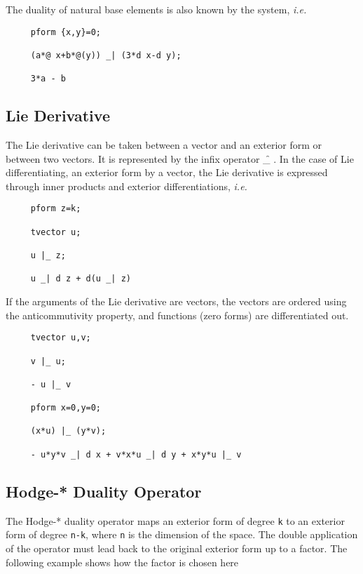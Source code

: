 The duality of natural base elements is also known by the system, \emph{i.e.}

\begin{verbatim}
     pform {x,y}=0;

     (a*@ x+b*@(y)) _| (3*d x-d y);

     3*a - b
\end{verbatim}

\subsection{Lie Derivative}

The Lie derivative can be taken between a vector and an exterior form
or between two vectors.  It is represented by the infix operator \f{\textbar\_}
\label{lie}.  In the case of Lie differentiating, an exterior form by
a vector, the Lie derivative is expressed through inner products and
exterior differentiations, \emph{i.e.}
\hypertarget{reserved:liederivativeop}{}
\begin{verbatim}
     pform z=k;

     tvector u;

     u |_ z;

     u _| d z + d(u _| z)
\end{verbatim}

If the arguments of the Lie derivative are vectors, the vectors are
ordered using the anticommutivity property, and functions (zero forms)
are differentiated out.

\example{}

\begin{verbatim}
     tvector u,v;

     v |_ u;

     - u |_ v

     pform x=0,y=0;

     (x*u) |_ (y*v);

     - u*y*v _| d x + v*x*u _| d y + x*y*u |_ v
\end{verbatim}

\subsection{Hodge-* Duality Operator}

 
\hypertarget{reserved:hodegestareop}{}
The Hodge-*\label{hodge} duality operator maps an exterior form of degree
\texttt{k} to an exterior form of degree \texttt{n-k}, where \texttt{n} is the
dimension of the space.  The double application of the operator must
lead back to the original exterior form up to a factor. The following
example shows how the factor is chosen here

